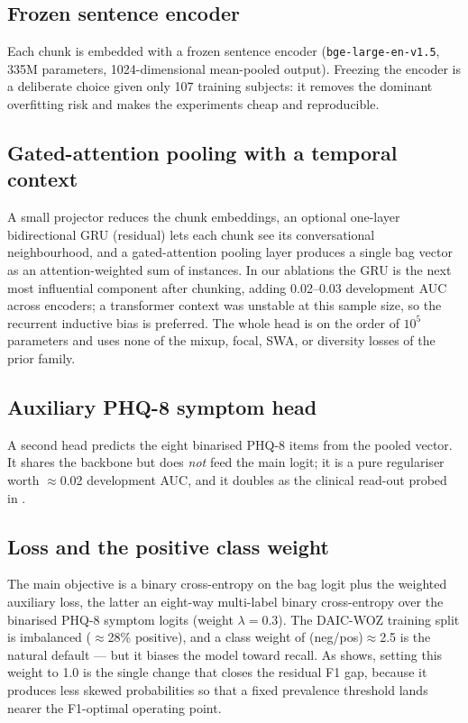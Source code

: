 \documentclass[conference]{IEEEtran}
\begin{document}
\subsection{Frozen sentence encoder}
Each chunk is embedded with a frozen sentence encoder
(\texttt{bge-large-en-v1.5}, 335M parameters, 1024-dimensional mean-pooled
output). Freezing the encoder is a deliberate choice given only 107 training
subjects: it removes the dominant overfitting risk and makes the experiments
cheap and reproducible.

\subsection{Gated-attention pooling with a temporal context}
A small projector reduces the chunk embeddings, an optional one-layer
bidirectional GRU (residual) lets each chunk see its conversational
neighbourhood, and a gated-attention pooling layer \cite{ilse2018} produces a
single bag vector as an attention-weighted sum of instances. In our ablations the
GRU is the next most influential component after chunking, adding 0.02--0.03
development AUC across encoders; a transformer context was unstable at this sample size, so
the recurrent inductive bias is preferred. The whole head is on the order of
$10^5$ parameters and uses none of the mixup, focal, SWA, or diversity losses
of the prior family.

\subsection{Auxiliary PHQ-8 symptom head}
A second head predicts the eight binarised PHQ-8 items from the pooled vector.
It shares the backbone but does \emph{not} feed the main logit; it is a pure
regulariser worth $\approx$0.02 development AUC, and it doubles as the
clinical read-out probed in .

\subsection{Loss and the positive class weight}
The main objective is a binary cross-entropy on the bag logit plus the
weighted auxiliary loss, the latter an eight-way multi-label binary
cross-entropy over the binarised PHQ-8 symptom logits (weight $\lambda=0.3$).
The DAIC-WOZ training split is imbalanced
($\approx$28\% positive), and a class weight of (neg/pos)$\approx$2.5 is the
natural default --- but it biases the model toward recall. As
 shows, setting this weight to 1.0 is the single
change that closes the residual F1 gap, because it produces less skewed
probabilities so that a fixed prevalence threshold lands nearer the
F1-optimal operating point.
\end{document}
